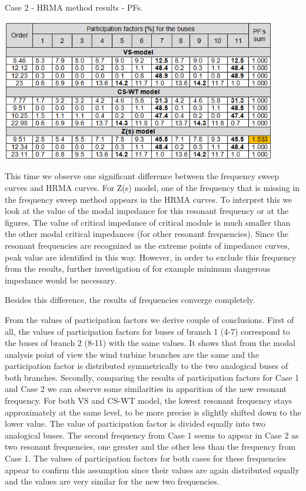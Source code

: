\documentclass[12pt]{report} %
\begin{document}
\begin{table}[htb]
	\caption{Case 2 - HRMA method results - PFs.}
	\label{tab:case2tablehrma2}
	\centering
	\includegraphics[width=0.9\textwidth]{img/Case2/table_HRMA2.png}
\end{table}
\FloatBarrier

This time we observe one significant difference between the frequency sweep curves and HRMA curves. For Z(s) model, one of the frequency that is missing in the frequency sweep method appears in the HRMA curves. To interpret this we look at the value of the modal impedance for this resonant frequency or at the figures. The value of critical impedance of critical module is much smaller than the other modal critical impedances (for other resonant frequencies). Since the resonant frequencies are recognized as the extreme points of impedance curves, peak value are identified in this way. However, in order to exclude this frequency from the results, further investigation of for example minimum dangerous impedance would be necessary.

Besides this difference, the results of frequencies converge completely. 

From the values of participation factors we derive couple of conclusions. First of all, the values of participation factors for buses of branch 1 (4-7) correspond to the buses of branch 2 (8-11) with the same values. It shows that from the modal analysis point of view the wind turbine branches are the same and the participation factor is distributed symmetrically to the two analogical buses of both branches. Secondly, comparing the results of participation factors for Case 1 and Case 2 we can observe some similarities in apparition of the new resonant frequency. For both VS and CS-WT model, the lowest resonant frequency stays approximately at the same level, to be more precise is slightly shifted down to the lower value. The value of participation factor is divided equally into two analogical buses. The second frequency from Case 1 seems to appear in Case 2 as two resonant frequencies, one greater and the other less than the frequency from Case 1. The values of participation factors for both cases for these frequencies appear to confirm this assumption since their values are again distributed equally and the values are very similar for the new two frequencies.
\end{document}
